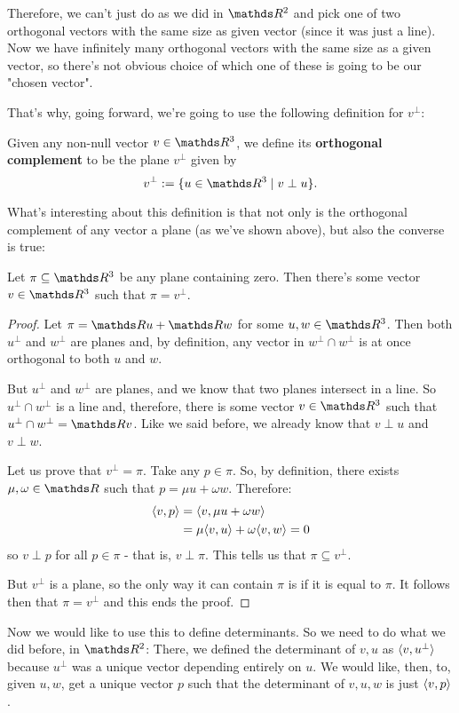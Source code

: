 Therefore, we can't just do as we did in $\R^2$ and pick one of two orthogonal vectors with the same size as given vector (since it was just a line). Now we have infinitely many orthogonal vectors with the same size as a given vector, so there's not obvious choice of which one of these is going to be our "chosen vector".

That's why, going forward, we're going to use the following definition for $v^\perp$:

\begin{df}
	Given any non-null vector $v\in \R^3$, we define its \textbf{orthogonal complement} to be the plane $v^\perp$ given by
	\[v^\perp:=\{u\in \R^3\mid v\perp u\}.\]
\end{df}

What's interesting about this definition is that not only is the orthogonal complement of any vector a plane (as we've shown above), but also the converse is true:

\begin{lemma}
	Let $\pi\subseteq\R^3$ be any plane containing zero. Then there's some vector $v\in \R^3$ such that $\pi=v^\perp$.
\end{lemma}
\begin{proof}
	Let $\pi=\R u+\R w$ for some $u,w\in \R^3$. Then both $u^\perp$ and $w^\perp$ are planes and, by definition, any vector in $w^\perp\cap w^\perp$ is at once orthogonal to both $u$ and $w$.
	
	But $u^\perp$ and $w^\perp$ are planes, and we know that two planes intersect in a line. So $u^\perp\cap w^\perp$ is a line and, therefore, there is some vector $v\in \R^3$ such that $u^\perp\cap w^\perp = \R v$. Like we said before, we already know that $v\perp u$ and $v\perp w$.
	
	Let us prove that $v^\perp = \pi$. Take any $p\in \pi$. So, by definition, there exists $\mu,\omega\in \R$ such that $p=\mu u+\omega w$. Therefore:
	\begin{align*}
		\langle v,p\rangle&=\langle v,\mu u+\omega w\rangle\\
		&=\mu\langle v,u\rangle+\omega\langle v,w\rangle=0
	\end{align*}so $v\perp p$ for all $p\in \pi$ - that is, $v\perp \pi$. This tells us that $\pi\subseteq v^\perp$.
	
	But $v^\perp$ is a plane, so the only way it can contain $\pi$ is if it is equal to $\pi$. It follows then that $\pi= v^\perp$ and this ends the proof.
\end{proof}

Now we would like to use this to define determinants. So we need to do what we did before, in $\R^2$: There, we defined the determinant of $v,u$ as $\langle v,u^\perp\rangle$ because $u^\perp$ was a unique vector depending entirely on $u$. We would like, then, to, given $u,w$, get a unique vector $p$ such that the determinant of $v,u,w$ is just $\langle v,p\rangle$.

